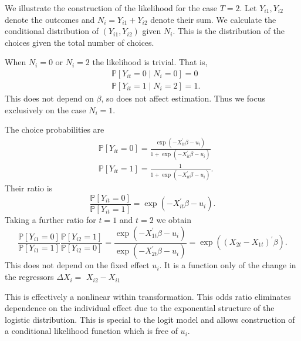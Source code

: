 \documentclass[10pt]{article}
\begin{document}
We illustrate the construction of the likelihood for the case $T=2$. Let $Y_{i 1}, Y_{i 2}$ denote the outcomes and $N_{i}=Y_{i 1}+Y_{i 2}$ denote their sum. We calculate the conditional distribution of $\left(Y_{i 1}, Y_{i 2}\right)$ given $N_{i}$. This is the distribution of the choices given the total number of choices.

When $N_{i}=0$ or $N_{i}=2$ the likelihood is trivial. That is,
$$
\begin{aligned}
&\mathbb{P}\left[Y_{i t}=0 \mid N_{i}=0\right]=0 \\
&\mathbb{P}\left[Y_{i t}=1 \mid N_{i}=2\right]=1 .
\end{aligned}
$$
This does not depend on $\beta$, so does not affect estimation. Thus we focus exclusively on the case $N_{i}=1$.

The choice probabilities are
$$
\begin{aligned}
&\mathbb{P}\left[Y_{i t}=0\right]=\frac{\exp \left(-X_{i t}^{\prime} \beta-u_{i}\right)}{1+\exp \left(-X_{i t}^{\prime} \beta-u_{i}\right)} \\
&\mathbb{P}\left[Y_{i t}=1\right]=\frac{1}{1+\exp \left(-X_{i t}^{\prime} \beta-u_{i}\right)} .
\end{aligned}
$$
Their ratio is
$$
\frac{\mathbb{P}\left[Y_{i t}=0\right]}{\mathbb{P}\left[Y_{i t}=1\right]}=\exp \left(-X_{i t}^{\prime} \beta-u_{i}\right) .
$$
Taking a further ratio for $t=1$ and $t=2$ we obtain
$$
\frac{\mathbb{P}\left[Y_{i 1}=0\right]}{\mathbb{P}\left[Y_{i 1}=1\right]} \frac{\mathbb{P}\left[Y_{i 2}=1\right]}{\mathbb{P}\left[Y_{i 2}=0\right]}=\frac{\exp \left(-X_{1 t}^{\prime} \beta-u_{i}\right)}{\exp \left(-X_{2 t}^{\prime} \beta-u_{i}\right)}=\exp \left(\left(X_{2 t}-X_{1 t}\right)^{\prime} \beta\right) .
$$
This does not depend on the fixed effect $u_{i}$. It is a function only of the change in the regressors $\Delta X_{i}=$ $X_{i 2}-X_{i 1}$

This is effectively a nonlinear within transformation. This odds ratio eliminates dependence on the individual effect due to the exponential structure of the logistic distribution. This is special to the logit model and allows construction of a conditional likelihood function which is free of $u_{i}$.
\end{document}
